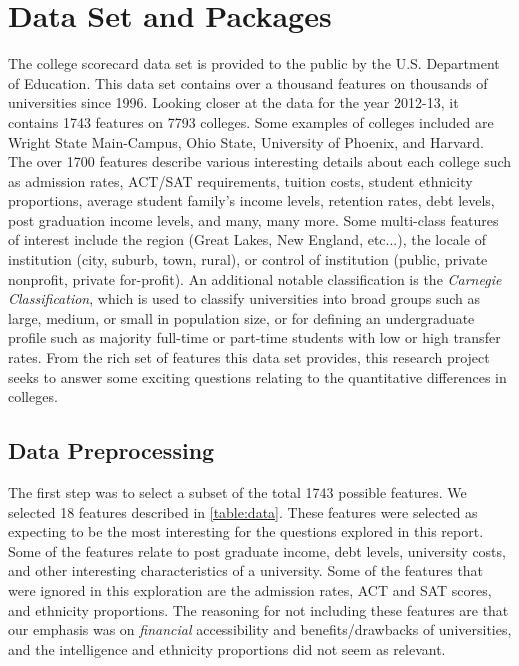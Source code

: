 \documentclass[10pt]{article}
\begin{document}
\section{Data Set and Packages}

The college scorecard data set \cite{collegeScorecard} is provided to the public by the U.S. Department of Education. This data set contains over a thousand features on thousands of universities since 1996. Looking closer at the data for the year 2012-13, it contains 1743 features on 7793 colleges. Some examples of colleges included are Wright State Main-Campus, Ohio State, University of Phoenix, and Harvard. The over 1700 features describe various interesting details about each college such as admission rates, ACT/SAT requirements, tuition costs, student ethnicity proportions, average student family's income levels, retention rates, debt levels, post graduation income levels, and many, many more. Some multi-class features of interest include the region (Great Lakes, New England, etc...), the locale of institution (city, suburb, town, rural), or control of institution (public, private nonprofit, private for-profit). An additional notable classification is the \textit{Carnegie Classification}, which is used to classify universities into broad groups such as large, medium, or small in population size, or for defining an undergraduate profile such as majority full-time or part-time students with low or high transfer rates. From the rich set of features this data set provides, this research project seeks to answer some exciting questions relating to the quantitative differences in colleges. 

\subsection{Data Preprocessing}

 The first step was to select a subset of the total 1743 possible features. We selected 18 features described in \ref{table:data}. These features were selected as expecting to be the most interesting for the questions explored in this report. Some of the features relate to post graduate income, debt levels, university costs, and other interesting characteristics of a university. Some of the features that were ignored in this exploration are the admission rates, ACT and SAT scores, and ethnicity proportions. The reasoning for not including these features are that our emphasis was on \textit{financial} accessibility and benefits/drawbacks of universities, and the intelligence and ethnicity proportions did not seem as relevant.
\end{document}
